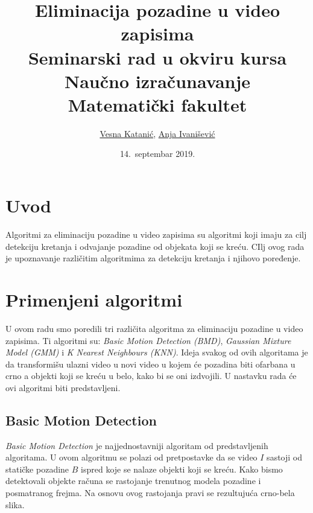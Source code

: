 \documentclass[a4paper]{article}
\begin{document}
\title{Eliminacija pozadine u video zapisima\\ \small{Seminarski rad u okviru kursa\\Naučno izračunavanje\\ Matematički fakultet}}

\author{\href{mailto:mi14097@matf.bg.ac.rs}{Vesna Katanić}, \href{mailto:mi14022@matf.bg.ac.rs}{Anja Ivanišević}}
\date{14.~septembar 2019.}
\maketitle

\tableofcontents

\newpage

\section{Uvod}
\label{sec:uvod}

Algoritmi za eliminaciju pozadine u video zapisima su algoritmi koji imaju za cilj detekciju kretanja i odvajanje pozadine od objekata koji se kreću. CIlj ovog rada je upoznavanje različitim algoritmima za detekciju kretanja i njihovo poređenje.

\section{Primenjeni algoritmi}
\label{sec:algoritmi}

U ovom radu smo poredili tri različita algoritma za eliminaciju pozadine u video zapisima. Ti algoritmi su: \emph{Basic Motion Detection (BMD)}, \emph{Gaussian Mixture Model (GMM)} i \emph{K Nearest Neighbours (KNN)}. Ideja svakog od ovih algoritama je da transformišu ulazni video u novi video u kojem će pozadina biti ofarbana u crno a objekti koji se kreću u belo, kako bi se oni izdvojili. U nastavku rada će ovi algoritmi biti predstavljeni.

\subsection{Basic Motion Detection}

\emph{Basic Motion Detection} je najjednostavniji algoritam od predstavljenih algoritama. U ovom algoritmu se polazi od pretpostavke da se video $I$ sastoji od statičke pozadine $B$ ispred koje se nalaze objekti koji se kreću. Kako bismo detektovali objekte računa se rastojanje trenutnog modela pozadine i posmatranog frejma. Na osnovu ovog rastojanja pravi se rezultujuća crno-bela slika. 
\end{document}

